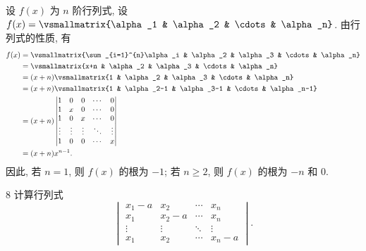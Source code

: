 \begin{solution}
    设 \(f(x)\) 为 \(n\) 阶行列式, 设 \(f(x)=\vsmallmatrix{\alpha_1 & \alpha_2 & \cdots & \alpha_n}\).
    由行列式的性质, 有
    \begin{align*}
        f(x)&=\vsmallmatrix{\sum_{i=1}^{n}\alpha_i & \alpha_2 & \alpha_3 & \cdots & \alpha_n}\\
        &=\vsmallmatrix{x+n & \alpha_2 & \alpha_3 & \cdots & \alpha_n}\\
        &=(x+n)\vsmallmatrix{1 & \alpha_2 & \alpha_3 & \cdots & \alpha_n}\\
        &=(x+n)\vsmallmatrix{1 & \alpha_2-1 & \alpha_3-1 & \cdots & \alpha_n-1}\\
        &=(x+n)
        \begin{vmatrix}
            1 & 0 & 0 & \cdots & 0\\
            1 & x & 0 & \cdots & 0\\
            1 & 0 & x & \cdots & 0\\
            \vdots & \vdots & \vdots & \ddots & \vdots\\
            1 & 0 & 0 & \cdots & x
        \end{vmatrix}\\
        &=(x+n)x^{n-1}.
    \end{align*}
    因此, 若 \(n=1\), 则 \(f(x)\) 的根为 \(-1\); 若 \(n\geq2\), 则 \(f(x)\) 的根为 \(-n\) 和 \(0\).
\end{solution}

\begin{ex}{8}\label{ex:2.2.8}
    计算行列式
    \[
    \begin{vmatrix}
        x_1-a & x_2 & \cdots & x_n\\
        x_1 & x_2-a & \cdots & x_n\\
        \vdots & \vdots & \ddots & \vdots\\
        x_1 & x_2 & \cdots & x_n-a
    \end{vmatrix}.
    \]
\end{ex}

